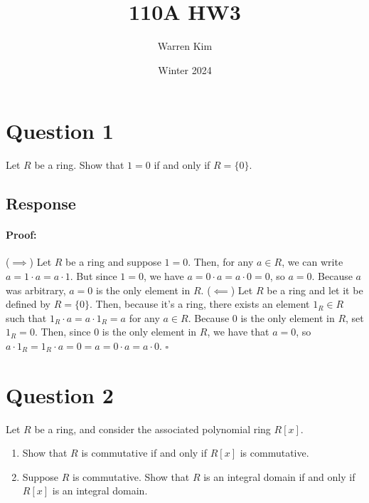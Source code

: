 \documentclass [12pt] {article}
\title{110A HW3}
\author{Warren Kim}
\date{Winter 2024}
\newenvironment{proof}{\paragraph{Proof:}}{\hfill$\square$}
\begin{document}
\maketitle

\section*{Question 1}
Let $R$ be a ring. Show that $1=0$ if and only if $R=\{0\}$. 
\subsection*{Response}
\begin{proof}
    ($\implies$) Let $R$ be a ring and suppose $1 = 0$. Then, for any $a \in R$, we can write 
    $a = 1 \cdot a = a \cdot 1$. But since $1 = 0$, we have $a = 0 \cdot a = a \cdot 0 = 0$, so 
    $a = 0$. Because $a$ was arbitrary, $a = 0$ is the only element in $R$.
    \newline
    ($\impliedby$) Let $R$ be a ring and let it be defined by $R = \{ 0 \}$. Then, because it's a
    ring, there exists an element $1_R \in R$ such that $1_R \cdot a = a \cdot 1_R = a$ for any $a \in R$.
    Because $0$ is the only element in $R$, set $1_R = 0$. Then, since $0$ is the only element in
    $R$, we have that $a = 0$, so $a \cdot 1_R = 1_R \cdot a = 0 = a = 0 \cdot a = a \cdot 0$.
\end{proof}
\newpage

\section*{Question 2}
Let $R$ be a ring, and consider the associated polynomial ring $R[x]$. 

\begin{enumerate}
    \item Show that $R$ is commutative if and only if $R[x]$ is commutative. 
    
    \item Suppose $R$ is commutative. Show that $R$ is an integral domain if and only if $R[x]$ is an integral domain. 
\end{enumerate}
\end{document}
